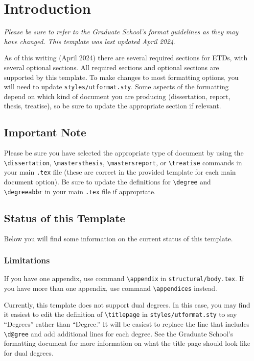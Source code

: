 \chapter{Introduction}
\emph{Please be sure to refer to the Graduate School's format guidelines as they may have changed. This template was last updated April 2024.}

As of this writing (April 2024) there are several required sections for ETDs, with several optional sections. All required sections and optional sections are supported by this template. To make changes to most formatting options, you will need to update \verb|styles/utformat.sty|. Some aspects of the formatting depend on which kind of document you are producing (dissertation, report, thesis, treatise), so be sure to update the appropriate section if relevant.

\section{Important Note}
Please be sure you have selected the appropriate type of document by using the \verb|\dissertation|, \verb|\mastersthesis|, \verb|\mastersreport|, or \verb|\treatise| commands in your main \verb|.tex| file (these are correct in the provided template for each main document option). Be sure to update the definitions for \verb|\degree| and \verb|\degreeabbr| in your main \verb|.tex| file if appropriate.

\section{Status of this Template}
Below you will find some information on the current status of this template.
\subsection{Limitations}
If you have one appendix, use command \verb|\appendix| in \verb|structural/body.tex|. If you have more than one appendix, use command \verb|\appendices| instead.

Currently, this template does not support dual degrees. In this case, you may find it easiest to edit the definition of \verb|\titlepage| in \verb|styles/utformat.sty| to say ``Degrees'' rather than ``Degree.'' It will be easiest to replace the line that includes \verb|\d@gree| and add additional lines for each degree. See the Graduate School's formatting document for more information on what the title page should look like for dual degrees.

